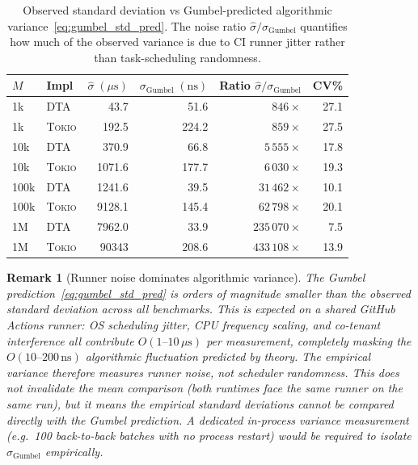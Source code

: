 \documentclass[11pt,a4paper]{article}
\newtheorem{remark}{Remark}[section]
\newcommand{\dtact}{\textsc{DTA}}
\newcommand{\tokio}{\textsc{Tokio}}
\begin{document}
\begin{table}[htbp]
\centering
\small
\caption{Observed standard deviation vs Gumbel-predicted algorithmic
variance~\eqref{eq:gumbel_std_pred}.  The noise ratio $\hat\sigma/\sigma_{\mathrm{Gumbel}}$
quantifies how much of the observed variance is due to CI runner jitter
rather than task-scheduling randomness.}
\label{tab:gumbel}
\begin{tabularx}{\linewidth}{@{}lXrrrr@{}}
\toprule
$M$ & Impl
  & $\hat\sigma\;(\mu\mathrm{s})$
  & $\sigma_{\mathrm{Gumbel}}\;(\mathrm{ns})$
  & Ratio $\hat\sigma/\sigma_{\mathrm{Gumbel}}$
  & CV\% \\
\midrule
1k  & \dtact  & 43.7   & 51.6  & $846\times$  & 27.1 \\
1k  & \tokio  & 192.5  & 224.2 & $859\times$  & 27.5 \\
10k & \dtact  & 370.9  & 66.8  & $5\,555\times$  & 17.8 \\
10k & \tokio  & 1071.6 & 177.7 & $6\,030\times$  & 19.3 \\
100k& \dtact  & 1241.6 & 39.5  & $31\,462\times$ & 10.1 \\
100k& \tokio  & 9128.1 & 145.4 & $62\,798\times$ & 20.1 \\
1M  & \dtact  & 7962.0 & 33.9  & $235\,070\times$&  7.5 \\
1M  & \tokio  & 90343  & 208.6 & $433\,108\times$& 13.9 \\
\bottomrule
\end{tabularx}
\end{table}

\begin{remark}[Runner noise dominates algorithmic variance]
The Gumbel prediction~\eqref{eq:gumbel_std_pred} is orders of magnitude smaller
than the observed standard deviation across all benchmarks.
This is expected on a shared GitHub Actions runner: OS scheduling jitter,
CPU frequency scaling, and co-tenant interference all contribute
$O(1\text{--}10\,\mu\mathrm{s})$ per measurement, completely masking the
$O(10\text{--}200\,\mathrm{ns})$ algorithmic fluctuation predicted by theory.
The empirical variance therefore measures \emph{runner noise}, not
\emph{scheduler randomness}.  This does not invalidate the mean comparison
(both runtimes face the same runner on the same run), but it means the
empirical standard deviations cannot be compared directly with the Gumbel
prediction.  A dedicated in-process variance measurement (e.g.\
100 back-to-back batches with no process restart) would be required
to isolate $\sigma_{\mathrm{Gumbel}}$ empirically.
\end{remark}
\end{document}
